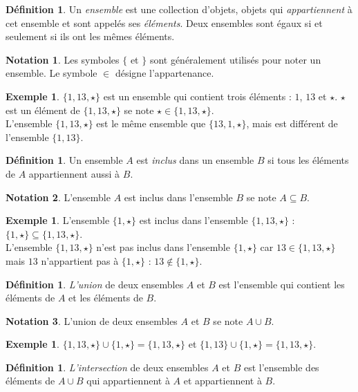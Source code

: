 \documentclass[a4paper,13pt]{scrreprt}
\theoremstyle{plain}
\theoremstyle{definition}
\newtheorem{déf}[subsection]{Définition}
\newtheorem{exe}[subsection]{Exemple}
\newtheorem*{nota}{Notation}
\begin{document}
\begin{déf}
	Un \emph{ensemble} est une collection d'objets, objets qui \emph{appartiennent} à cet ensemble et sont appelés ses \emph{éléments}. Deux ensembles sont égaux si et seulement si ils ont les mêmes éléments.
\end{déf}
\begin{nota}
	Les symboles $\{$ et $\}$ sont généralement utilisés pour noter un ensemble. Le symbole $\in$ désigne l'appartenance.
\end{nota}
\begin{exe}
	$\{1,13,\star\}$ est un ensemble qui contient trois éléments : $1$, $13$ et $\star$. \og $\star$ est un élément de $\{1,13,\star\}$ \fg{} se note $\star \in \{1,13,\star\}$. \\
	L'ensemble $\{1,13,\star\}$ est le même ensemble que $\{13,1,\star\}$, mais est différent de l'ensemble $\{1,13\}$.
\end{exe}
\begin{déf}
	Un ensemble $A$ est \emph{inclus} dans un ensemble $B$ si tous les éléments de $A$ appartiennent aussi à $B$.
\end{déf}
\begin{nota}
	\og L'ensemble $A$ est inclus dans l'ensemble $B$ \fg{} se note $A \subseteq B$.
\end{nota}
\begin{exe}
	L'ensemble $\{1,\star\}$ est inclus dans l'ensemble $\{1,13,\star\}$ : $\{1,\star\} \subseteq \{1,13,\star\}$. \\
	L'ensemble $\{1,13,\star\}$ n'est pas inclus dans l'ensemble $\{1,\star\}$ car $13 \in \{1,13,\star\}$ mais $13$ n'appartient pas à $\{1,\star\}$ : $13 \notin \{1,\star\}$.
\end{exe}
\begin{déf}
	\emph{L'union} de deux ensembles $A$ et $B$ est l'ensemble qui contient les éléments de $A$ et les éléments de $B$.
\end{déf}
\begin{nota}
	L'union de deux ensembles $A$ et $B$ se note $A\cup B$.
\end{nota}
\begin{exe}
	$\{1,13,\star\} \cup \{1,\star\} = \{1,13,\star\}$ et $\{1,13\} \cup \{1,\star\} = \{1,13,\star\}$.
\end{exe}
\begin{déf}
	\emph{L'intersection} de deux ensembles $A$ et $B$ est l'ensemble des éléments de $A \cup B$ qui appartiennent à $A$ et appartiennent à $B$.
\end{déf}
\end{document}
